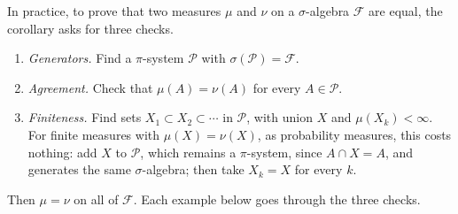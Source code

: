 \begin{notechapter}
In practice, to prove that two measures $\mu$ and $\nu$ on a
$\sigma$-algebra $\mathcal F$ are equal, the corollary asks for three
checks.
\begin{enumerate}[nosep, label=(\alph*)]
  \item \emph{Generators.} Find a $\pi$-system $\mathcal P$ with
        $\sigma(\mathcal P) = \mathcal F$.
  \item \emph{Agreement.} Check that $\mu(A) = \nu(A)$ for every
        $A\in\mathcal P$.
  \item \emph{Finiteness.} Find sets $X_1\subset X_2\subset\cdots$ in
        $\mathcal P$, with union $X$ and $\mu(X_k) < \infty$. For finite
        measures with $\mu(X) = \nu(X)$, as probability measures, this
        costs nothing: add $X$ to $\mathcal P$, which remains a
        $\pi$-system, since $A\cap X = A$, and generates the same
        $\sigma$-algebra; then take $X_k = X$ for every $k$.
\end{enumerate}
Then $\mu = \nu$ on all of $\mathcal F$. Each example below goes
through the three checks.


\end{notechapter}
